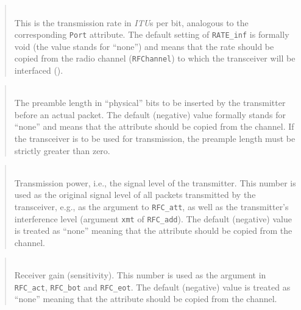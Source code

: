 \begin{quote}
\noindent{}\\ \hspace{0in}
This is the transmission rate in {\em ITU\/}s per bit,
analogous to the corresponding {\tt Port} attribute.
The default setting of {\tt RATE\_inf} is formally void (the value
stands for ``none'')
and means that the rate should be copied from the radio channel
({\tt RFChannel}) to which the transceiver will be
interfaced ().
\end{quote}

\begin{quote}
\noindent{}\\ \hspace{0in}
The preamble length in ``physical'' bits to be inserted by the transmitter
before an actual packet.
The default (negative) value formally stands for ``none'' and means that the
attribute should be copied from the channel.
If the transceiver is to be used for transmission, the preample length must
be strictly greater than zero.
\end{quote}

\begin{quote}
\noindent{}\\ \hspace{0in}
Transmission power, i.e., the signal level of the transmitter.
This number is used as the original signal level of all packets transmitted
by the transceiver, e.g., as the argument to {\tt RFC\_att}, as well as the
transmitter's interference level (argument {\tt xmt} of {\tt RFC\_add}).
The default (negative) value is treated as ``none'' meaning that the
attribute should be copied from the channel.
\end{quote}

\begin{quote}
\noindent{}\\ \hspace{0in}
Receiver gain (sensitivity).
This number is used as the argument
in {\tt RFC\_act}, {\tt RFC\_bot} and {\tt RFC\_eot}.
The default (negative) value is treated as ``none'' meaning that the
attribute should be copied from the channel.
\end{quote}

